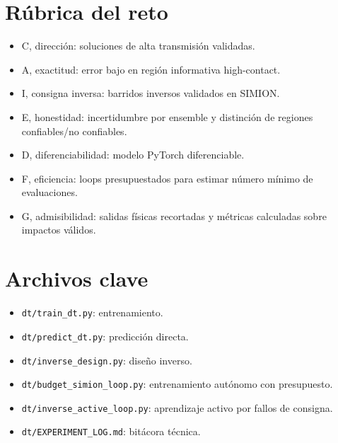 \documentclass[11pt]{article}
\begin{document}
\section{Rúbrica del reto}
\begin{itemize}
\item C, dirección: soluciones de alta transmisión validadas.
\item A, exactitud: error bajo en región informativa high-contact.
\item I, consigna inversa: barridos inversos validados en SIMION.
\item E, honestidad: incertidumbre por ensemble y distinción de regiones confiables/no confiables.
\item D, diferenciabilidad: modelo PyTorch diferenciable.
\item F, eficiencia: loops presupuestados para estimar número mínimo de evaluaciones.
\item G, admisibilidad: salidas físicas recortadas y métricas calculadas sobre impactos válidos.
\end{itemize}

\section{Archivos clave}
\begin{itemize}
\item \texttt{dt/train\_dt.py}: entrenamiento.
\item \texttt{dt/predict\_dt.py}: predicción directa.
\item \texttt{dt/inverse\_design.py}: diseño inverso.
\item \texttt{dt/budget\_simion\_loop.py}: entrenamiento autónomo con presupuesto.
\item \texttt{dt/inverse\_active\_loop.py}: aprendizaje activo por fallos de consigna.
\item \texttt{dt/EXPERIMENT\_LOG.md}: bitácora técnica.
\end{itemize}
\end{document}
